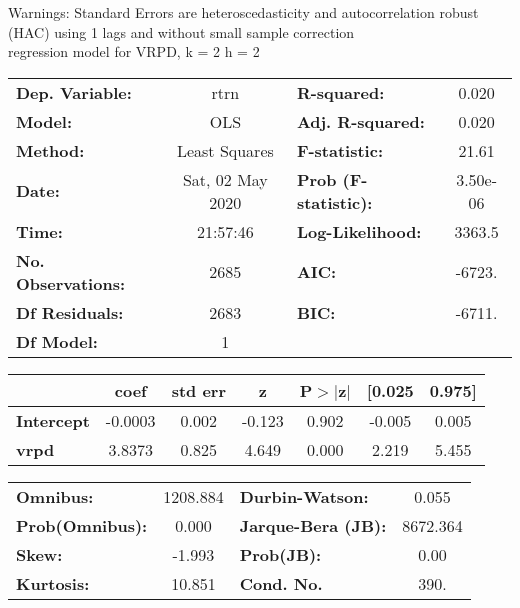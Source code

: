 Warnings: \newline
 [1] Standard Errors are heteroscedasticity and autocorrelation robust (HAC) using 1 lags and without small sample correction\\ 

regression model for VRPD, k = 2 h = 2\begin{center}
\begin{tabular}{lclc}
\toprule
\textbf{Dep. Variable:}    &       rtrn       & \textbf{  R-squared:         } &     0.020   \\
\textbf{Model:}            &       OLS        & \textbf{  Adj. R-squared:    } &     0.020   \\
\textbf{Method:}           &  Least Squares   & \textbf{  F-statistic:       } &     21.61   \\
\textbf{Date:}             & Sat, 02 May 2020 & \textbf{  Prob (F-statistic):} &  3.50e-06   \\
\textbf{Time:}             &     21:57:46     & \textbf{  Log-Likelihood:    } &    3363.5   \\
\textbf{No. Observations:} &        2685      & \textbf{  AIC:               } &    -6723.   \\
\textbf{Df Residuals:}     &        2683      & \textbf{  BIC:               } &    -6711.   \\
\textbf{Df Model:}         &           1      & \textbf{                     } &             \\
\bottomrule
\end{tabular}
\begin{tabular}{lcccccc}
                   & \textbf{coef} & \textbf{std err} & \textbf{z} & \textbf{P$> |$z$|$} & \textbf{[0.025} & \textbf{0.975]}  \\
\midrule
\textbf{Intercept} &      -0.0003  &        0.002     &    -0.123  &         0.902        &       -0.005    &        0.005     \\
\textbf{vrpd}      &       3.8373  &        0.825     &     4.649  &         0.000        &        2.219    &        5.455     \\
\bottomrule
\end{tabular}
\begin{tabular}{lclc}
\textbf{Omnibus:}       & 1208.884 & \textbf{  Durbin-Watson:     } &    0.055  \\
\textbf{Prob(Omnibus):} &   0.000  & \textbf{  Jarque-Bera (JB):  } & 8672.364  \\
\textbf{Skew:}          &  -1.993  & \textbf{  Prob(JB):          } &     0.00  \\
\textbf{Kurtosis:}      &  10.851  & \textbf{  Cond. No.          } &     390.  \\
\bottomrule
\end{tabular}
\end{center}

